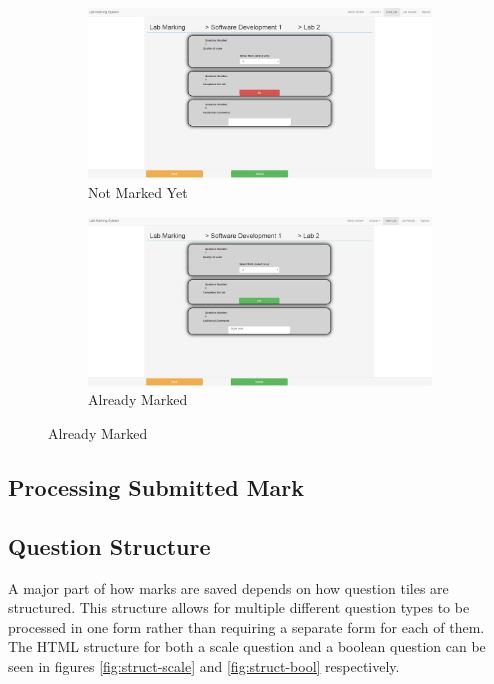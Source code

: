 \documentclass[11pt]{report}
\begin{document}
\begin{figure}[H]
\caption{Marking Student Page}
\centering
\begin{subfigure}[c]{0.45\textwidth}
    \includegraphics[width=1\textwidth]{images/implementation/marking-5-page.png}
    \caption{Not Marked Yet}
    \label{fig:marking-not}
\end{subfigure}
\hfill
\begin{subfigure}[c]{0.45\textwidth}
    \includegraphics[width=1\textwidth]{images/implementation/marking-6-page.png}
    \caption{Already Marked}
    \label{fig:marking-already}
\end{subfigure}

\end{figure}


\subsection{Processing Submitted Mark}

\subsection*{Question Structure}

A major part of how marks are saved depends on how question tiles are structured. This structure allows for multiple different question types to be processed in one form rather than requiring a separate form for each of them. The HTML structure for both a scale question and a boolean question can be seen in figures \ref{fig:struct-scale} and \ref{fig:struct-bool} respectively.  
\end{document}
